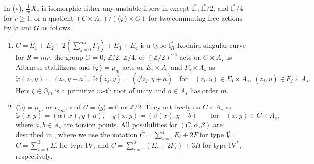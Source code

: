 \documentclass[reqno, letterpaper]{amsart}
\numberwithin{equation}{subsection}
\newcommand{\GG}{\mathbb{G}}
\newcommand{\ZZ}{\mathbb{Z}}
\begin{document}
		\begin{theorem} \label{thm:classification of multiple fiber v}
			In (v), $\frac{1}{m}X_s$ is isomorphic either any unstable fibers in  except $\mathrm I_r^*$, $\mathrm I_r^*/2$, and $\mathrm I_r^*/4$ for $r \ge 1$, or a quotient $(C \times A_s) / (\langle \tilde \varphi \rangle \times G)$ for two commuting free actions by $\tilde \varphi$ and $G$ as follows.
			\begin{enumerate}
				\item[\textnormal{($\mathrm I_R^*$)}] $C = E_1 + E_2 + 2(\sum_{j=0}^{mr} F_j) + E_3 + E_4$ is a type $\mathrm I_R^*$ Kodaira singular curve for $R = mr$, the group $G = 0$, $\ZZ/2$, $\ZZ/4$, or $(\ZZ/2)^{\times 2}$ acts on $C \times A_s$ as Albanese stabilizers, and $\langle \tilde \varphi \rangle = \mu_m$ acts on $E_i \times A_s$ and $F_j \times A_s$ as
				\[ \tilde \varphi(z_i,y) = (z_i, y + a) ,\ \tilde \varphi(z_j,y) = (\zeta^j z_j, y + a) \quad\mbox{for}\quad (z_i, y) \in E_i \times A_s, \ (z_j,y) \in F_j \times A_s .\]
				Here $\zeta \in \GG_m$ is a primitive $m$-th root of unity and $a \in A_s$ has order $m$.
				
				\item[\textnormal{$\bullet$}] $\langle \tilde \varphi \rangle = \mu_m$ or $\mu_{2m}$, and $G = \langle g \rangle = 0$ or $\ZZ/2$. They act freely on $C \times A_s$ as
				\[ \tilde \varphi (x,y) = (\alpha(x), y+a) ,\quad g(x,y) = (\beta(x), y+b) \qquad\mbox{for}\quad (x,y) \in C \times A_s ,\]
				where $a, b \in A_s$ are torsion points. All possibilities for $(C, \alpha, \beta)$ are described in , where we use the notation $C = \sum_{i=1}^4 E_i + 2F$ for type $\mathrm I_0^*$, $C = \sum_{i=1}^3 E_i$ for type $\mathrm{IV}$, and $C = \sum_{i=1}^3 (E_i + 2F_i) + 3H$ for type $\mathrm{IV}^*$, respectively.
			\end{enumerate}
		\end{theorem}
		
\end{document}
